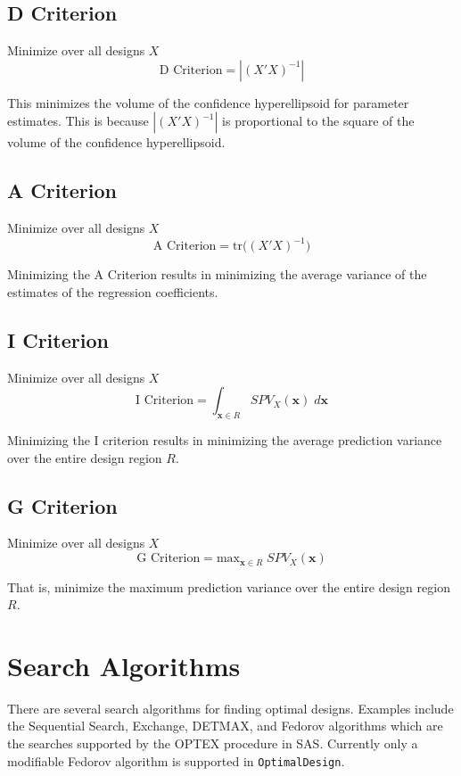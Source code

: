 \documentclass{article}\usepackage[]{graphicx}\usepackage[]{color}
\begin{document}
\subsection{D Criterion}
Minimize over all designs $X$
$$ \mbox{D Criterion} = |(X'X)^{-1}| $$

This minimizes the volume of the confidence hyperellipsoid for parameter estimates. This is because $|(X'X)^{-1}|$ is proportional to the square of the volume of the confidence hyperellipsoid.

\subsection{A Criterion}
Minimize over all designs $X$
$$ \mbox{A Criterion} = \mbox{tr} \big( (X'X)^{-1} \big) $$

Minimizing the A Criterion results in minimizing the average variance of the estimates of the regression coefficients.

\subsection{I Criterion}
Minimize over all designs $X$
$$ \mbox{I Criterion} = \int_{\textbf{x} \in R} SPV_X(\textbf{x}) \; d\textbf{x}$$

Minimizing the I criterion results in minimizing the average prediction variance over the entire design region $R$.

\subsection{G Criterion}
Minimize over all designs $X$
$$ \mbox{G Criterion} = \mbox{max}_{\textbf{x} \in R} \; SPV_X(\textbf{x})$$

That is, minimize the maximum prediction variance over the entire design region $R$.

\section{Search Algorithms}

There are several search algorithms for finding optimal designs. Examples include the Sequential Search, Exchange, DETMAX, and Fedorov algorithms which are the searches supported by the OPTEX procedure in SAS. Currently only a modifiable Fedorov algorithm is supported in \texttt{OptimalDesign}.
\end{document}
